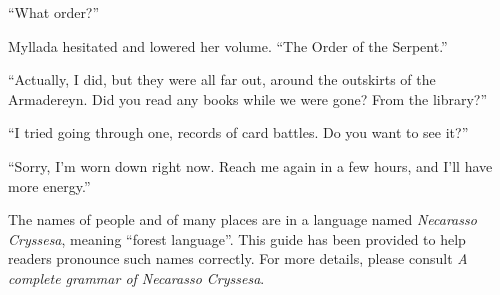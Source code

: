 ``What order?''

Myllada hesitated and lowered her volume. ``The Order of the Serpent.''

``Actually, I did, but they were all far out, around the outskirts of the Armadereyn. Did you read any books while we were gone? From the library?''

``I tried going through one, records of card battles. Do you want to see it?''

``Sorry, I'm worn down right now. Reach me again in a few hours, and I'll have more energy.''

\appendix
\showappendices


The names of people and of many places are in a language named \emph{Necarasso Cryssesa}, meaning ``forest language''. This guide has been provided to help readers pronounce such names correctly. For more details, please consult \emph{A complete grammar of Necarasso Cryssesa}.


